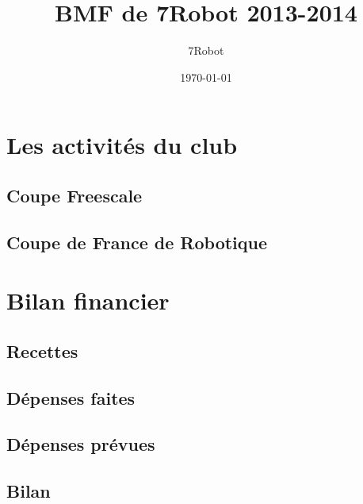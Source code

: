 \documentclass{beamer}
\title[BMF 7robot 2013-2014]{BMF de 7Robot 2013-2014}
\author{7Robot}
\date{\today}
\begin{document}
\begin{frame}
  \titlepage
\end{frame}

\begin{frame}
  \tableofcontents
\end{frame}

\section{Les activités du club}
  \subsection{Coupe Freescale}
    
  \subsection{Coupe de France de Robotique}
    

\section{Bilan financier}
    \subsection{Recettes}
    
    \subsection{Dépenses faites}
    
    \subsection{Dépenses prévues}
    
    \subsection{Bilan}
    
  
\end{document}
